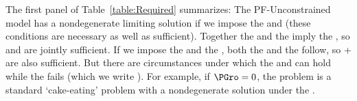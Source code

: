 \documentclass[BufferStockTheory]{subfiles}
\begin{document}
\begin{comment}
\begin{align}
  \vLevBF_{t}  & = \uFunc(\cRat_{t})+\DiscFac \uFunc(\cRat_{t}\Pat)+\DiscFac^{2} \uFunc(\cRat_{t} \Pat^{2})+... \label{eq:ValuePFAnalyticalAutarky}
  \\  & = \uFunc(\cRat_{t})\left(1+\DiscFac \Pat^{1-\CRRA}+(\DiscFac \Pat^{1-\CRRA})^{2}+...\right) \notag 
  \\  & = \uFunc(\cRat_{t})\left(\frac{1-(\DiscFac \Pat^{1-\CRRA})^{T-t+1}}{1-\DiscFac \Pat^{1-\CRRA}}\right) \notag
  \\  & = \left(\frac{\uFunc(1-\PatR)}{1-\DiscFac \Pat^{1-\CRRA}}\right) \notag
  \\  & \propto \left(\frac{(1-\PatR)^{1-\CRRA}}{1-\DiscFac \Pat^{1-\CRRA}}\right) \notag      \end{align}
\end{comment}



The first panel of Table~\ref{table:Required} summarizes:  The PF-Unconstrained model has a nondegenerate limiting solution if we impose the {\RIC} and {\FHWC} (these conditions are necessary as well as sufficient).  Together the {\PFFVAC} and the {\FHWC} imply the {\RIC}, so {\PFFVAC} and {\FHWC} are jointly sufficient.  If we impose the {\GIC} and the {\FHWC}, both the {\PFFVAC} and the {\RIC} follow, so {\GIC}+{\FHWC} are also sufficient.  But there are circumstances under which the {\RIC} and {\FHWC} can hold while the {\PFFVAC} fails (which we write \cncl{\PFFVAC}).  For example, if $\PGro=0$, the problem is a standard `cake-eating' problem with a nondegenerate solution under the {\RIC}.%
\end{document}
